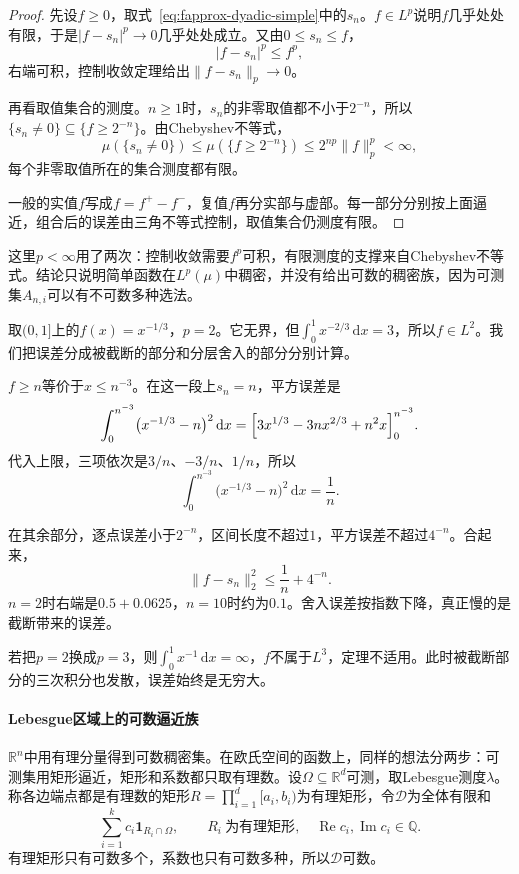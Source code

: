 \begin{proof}
先设$f\geq0$，取式~\eqref{eq:fapprox-dyadic-simple}中的$s_n$。$f\in L^p$说明$f$几乎处处有限，于是$\lvert f-s_n\rvert^p\to0$几乎处处成立。又由$0\leq s_n\leq f$，
\[
 \lvert f-s_n\rvert^p\leq f^p ,
\]
右端可积，控制收敛定理给出$\lVert f-s_n\rVert_p\to0$。

再看取值集合的测度。$n\geq1$时，$s_n$的非零取值都不小于$2^{-n}$，所以$\{s_n\neq0\}\subseteq\{f\geq2^{-n}\}$。由Chebyshev不等式，
\[
 \mu(\{s_n\neq0\})\leq\mu(\{f\geq2^{-n}\})\leq2^{np}\lVert f\rVert_p^p<\infty ,
\]
每个非零取值所在的集合测度都有限。

一般的实值$f$写成$f=f^+-f^-$，复值$f$再分实部与虚部。每一部分分别按上面逼近，组合后的误差由三角不等式控制，取值集合仍测度有限。
\end{proof}

这里$p<\infty$用了两次：控制收敛需要$f^p$可积，有限测度的支撑来自Chebyshev不等式。结论只说明简单函数在$L^p(\mu)$中稠密，并没有给出可数的稠密族，因为可测集$A_{n,i}$可以有不可数多种选法。

\begin{example}[两部分误差的大小]
取$(0,1]$上的$f(x)=x^{-1/3}$，$p=2$。它无界，但$\int_0^1x^{-2/3}\,\mathrm dx=3$，所以$f\in L^2$。我们把误差分成被截断的部分和分层舍入的部分分别计算。

$f\geq n$等价于$x\leq n^{-3}$。在这一段上$s_n=n$，平方误差是
\[
 \int_0^{n^{-3}}\bigl(x^{-1/3}-n\bigr)^2\,\mathrm dx
 =\Bigl[3x^{1/3}-3nx^{2/3}+n^2x\Bigr]_0^{n^{-3}}.
\]
代入上限，三项依次是$3/n$、$-3/n$、$1/n$，所以
\[
 \int_0^{n^{-3}}\bigl(x^{-1/3}-n\bigr)^2\,\mathrm dx=\frac1n .
\]

在其余部分，逐点误差小于$2^{-n}$，区间长度不超过$1$，平方误差不超过$4^{-n}$。合起来，
\[
 \lVert f-s_n\rVert_2^2\leq\frac1n+4^{-n}.
\]
$n=2$时右端是$0.5+0.0625$，$n=10$时约为$0.1$。舍入误差按指数下降，真正慢的是截断带来的误差。

若把$p=2$换成$p=3$，则$\int_0^1x^{-1}\,\mathrm dx=\infty$，$f$不属于$L^3$，定理不适用。此时被截断部分的三次积分也发散，误差始终是无穷大。
\end{example}

\paragraph{Lebesgue区域上的可数逼近族}
$\mathbb R^n$中用有理分量得到可数稠密集。在欧氏空间的函数上，同样的想法分两步：可测集用矩形逼近，矩形和系数都只取有理数。设$\Omega\subseteq\mathbb R^d$可测，取Lebesgue测度$\lambda$。称各边端点都是有理数的矩形$R=\prod_{i=1}^d[a_i,b_i)$为有理矩形，令$\mathcal D$为全体有限和
\[
 \sum_{i=1}^kc_i\mathbf 1_{R_i\cap\Omega},\qquad R_i\ \text{为有理矩形},\quad \operatorname{Re}c_i,\operatorname{Im}c_i\in\mathbb Q .
\]
有理矩形只有可数多个，系数也只有可数多种，所以$\mathcal D$可数。

